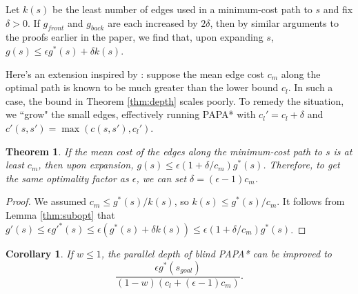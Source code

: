 \documentclass[letterpaper]{article}
\newtheorem{thm}{Theorem}
\newtheorem{cor}{Corollary}
\begin{document}
Let $k(s)$ be the least number of edges used in a minimum-cost path to $s$ and fix $\delta > 0$. If $g_{front}$ and $g_{back}$ are each increased by $2\delta$, then by similar arguments to the proofs earlier in the paper, we find that, upon expanding $s$, $g(s) \le \epsilon g^*(s) + \delta k(s)$.

Here's an extension inspired by \cite{klein1997randomized}: suppose the mean edge cost $c_m$ along the optimal path is known to be much greater than the lower bound $c_l$. In such a case, the bound in Theorem \ref{thm:depth} scales poorly. To remedy the situation, we ``grow" the small edges, effectively running PAPA* with $c_l' = c_l + \delta$ and $c'(s,s') = \max(c(s,s'), c_l')$.

\begin{thm}
\label{thm:delta}
If the mean cost of the edges along the minimum-cost path to $s$ is at least $c_m$, then upon expansion, $g(s) \le \epsilon(1+\delta/c_m)g^*(s)$. Therefore, to get the same optimality factor as $\epsilon$, we can set $\delta = (\epsilon-1)c_m$.
\end{thm}

\begin{proof}
We assumed $c_m \le g^*(s) / k(s)$, so $k(s) \le g^*(s) / c_m$.
It follows from Lemma \ref{thm:subopt} that $g'(s) \le \epsilon g'^*(s) \le \epsilon(g^*(s) + \delta k(s)) \le \epsilon(1+\delta/c_m)g^*(s)$.
\end{proof}

\begin{cor}
\label{cor:delta}
If $w \le 1$, the parallel depth of blind PAPA* can be improved to
\[\frac{\epsilon g^*(s_{goal})}{(1-w)(c_l+(\epsilon-1)c_m)}.\]
\end{cor}



\end{document}
